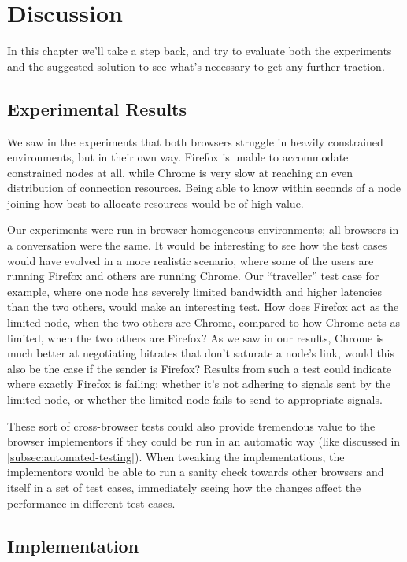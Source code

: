 \chapter{Discussion}
\label{chp:discussion}

In this chapter we'll take a step back, and try to evaluate both the experiments and the suggested solution to see what's necessary to get any further traction.


\section{Experimental Results}

We saw in the experiments that both browsers struggle in heavily constrained environments, but in their own way. Firefox is unable to accommodate constrained nodes at all, while Chrome is very slow at reaching an even distribution of connection resources. Being able to know within seconds of a node joining how best to allocate resources would be of high value.

Our experiments were run in browser-homogeneous environments; all browsers in a conversation were the same. It would be interesting to see how the test cases would have evolved in a more realistic scenario, where some of the users are running Firefox and others are running Chrome. Our ``traveller'' test case for example, where one node has severely limited bandwidth and higher latencies than the two others, would make an interesting test. How does Firefox act as the limited node, when the two others are Chrome, compared to how Chrome acts as limited, when the two others are Firefox? As we saw in our results, Chrome is much better at negotiating bitrates that don't saturate a node's link, would this also be the case if the sender is Firefox? Results from such a test could indicate where exactly Firefox is failing; whether it's not adhering to signals sent by the limited node, or whether the limited node fails to send to appropriate signals.

These sort of cross-browser tests could also provide tremendous value to the browser implementors if they could be run in an automatic way (like discussed in \autoref{subsec:automated-testing}). When tweaking the implementations, the implementors would be able to run a sanity check towards other browsers and itself in a set of test cases, immediately seeing how the changes affect the performance in different test cases.


\section{Implementation}

